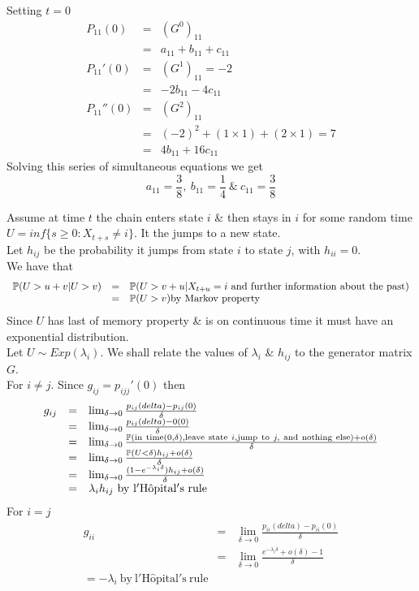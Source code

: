 \documentclass[11pt,a4paper]{article}
\begin{document}
Setting $t=0$
\[\begin{array}{rcl}
P_{11}(0)&=&(G^0)_{11}\\
&=&a_{11}+b_{11}+c_{11}\\
P_{11}'(0)&=&(G^1)_{11}=-2\\
&=&-2b_{11}-4c_{11}\\
P_{11}''(0)&=&(G^2)_{11}\\
&=&(-2)^2+(1\times1)+(2\times 1)=7\\
&=&4b_{11}+16c_{11}
\end{array}\]
Solving this series of simultaneous equations we get
$$a_{11}=\frac{3}{8},\ b_{11}=\frac{1}{4}\ \&\ c_{11}=\frac{3}{8}$$ 

Assume at time $t$ the chain enters state $i$ \& then stays in $i$ for some random time $U=inf\{s\geq0:X_{t+s}\neq i\}$. It the jumps to a new state.\\
Let $h_{ij}$ be the probability it jumps from state $i$ to state $j$, with $h_{ii}=0$.\\
We have that
\[\begin{array}{rcl}
\prob(U>u+v|U>v)&=&\prob(U>v+u|X_{t+u}=i\mathrm{\ and\ further\ information\ about\ the\ past})\\
&=&\prob(U>v) \mathrm{by\ Markov\ property}
\end{array}\]
Since $U$ has last of memory property \& is on continuous time it must have an exponential distribution.\\
Let $U\sim Exp(\lambda_i)$. We shall relate the values of $\lambda_i$ \& $h_{ij}$ to the generator matrix $G$.\\
For $i\neq j$. Since $g_{ij}=p_{ijj}'(0)$ then
\[\begin{array}{rcl}
g_{ij}&=&\lim_{\delta\to0}\frac{p_{ij}(delta)-p_{ij}(0)}{\delta}\\
&=&\lim_{\delta\to0}\frac{p_{ij}(delta)-0(0)}{\delta}\\
&=&\lim_{\delta\to0}\frac{\prob(\mathrm{in\ time} (0,\delta),\mathrm{leave\ state\ }i,\mathrm{jump\ to\ }j,\ \mathrm{and\ nothing\ else)}+o(\delta)}{\delta}\\
&=&\lim_{\delta\to0}\frac{\prob(U<\delta)h_{ij}+o(\delta)}{\delta}\\
&=&\lim_{\delta\to0}\frac{(1-e^{-\lambda_i\delta})h_{ij}+o(\delta)}{\delta}\\
&=&\lambda_ih_{ij}\mathrm{\ by\ l'H\hat{o}pital's\ rule}
\end{array}\]
For $i=j$
\[\begin{array}{rcl}
g_{ii}&=&\lim_{\delta\to0}\frac{p_{ii}(delta)-p_{ii}(0)}{\delta}\\
&=&\lim_{\delta\to0}\frac{e^{-\lambda_i\delta}+o(\delta)-1}{\delta}\\
=-\lambda_i\mathrm{\ by\ l'H\hat{o}pital's\ rule}
\end{array}\]
\end{document}
